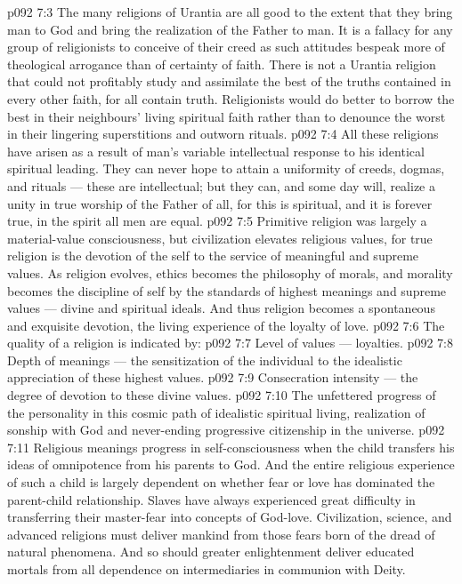 \vs p092 7:3 The many religions of Urantia are all good to the extent that they bring man to God and bring the realization of the Father to man. It is a fallacy for any group of religionists to conceive of their creed as  such attitudes bespeak more of theological arrogance than of certainty of faith. There is not a Urantia religion that could not profitably study and assimilate the best of the truths contained in every other faith, for all contain truth. Religionists would do better to borrow the best in their neighbours’ living spiritual faith rather than to denounce the worst in their lingering superstitions and outworn rituals.
\vs p092 7:4 All these religions have arisen as a result of man’s variable intellectual response to his identical spiritual leading. They can never hope to attain a uniformity of creeds, dogmas, and rituals --- these are intellectual; but they can, and some day will, realize a unity in true worship of the Father of all, for this is spiritual, and it is forever true, in the spirit all men are equal.
\vs p092 7:5 \pc Primitive religion was largely a material\hyp{}value consciousness, but civilization elevates religious values, for true religion is the devotion of the self to the service of meaningful and supreme values. As religion evolves, ethics becomes the philosophy of morals, and morality becomes the discipline of self by the standards of highest meanings and supreme values --- divine and spiritual ideals. And thus religion becomes a spontaneous and exquisite devotion, the living experience of the loyalty of love.
\vs p092 7:6 The quality of a religion is indicated by:
\vs p092 7:7 \bibnobreakspace Level of values --- loyalties.
\vs p092 7:8 \bibnobreakspace Depth of meanings --- the sensitization of the individual to the idealistic appreciation of these highest values.
\vs p092 7:9 \bibnobreakspace Consecration intensity --- the degree of devotion to these divine values.
\vs p092 7:10 \bibnobreakspace The unfettered progress of the personality in this cosmic path of idealistic spiritual living, realization of sonship with God and never\hyp{}ending progressive citizenship in the universe.
\vs p092 7:11 \pc Religious meanings progress in self\hyp{}consciousness when the child transfers his ideas of omnipotence from his parents to God. And the entire religious experience of such a child is largely dependent on whether fear or love has dominated the parent\hyp{}child relationship. Slaves have always experienced great difficulty in transferring their master\hyp{}fear into concepts of God\hyp{}love. Civilization, science, and advanced religions must deliver mankind from those fears born of the dread of natural phenomena. And so should greater enlightenment deliver educated mortals from all dependence on intermediaries in communion with Deity.
